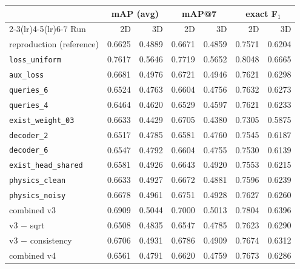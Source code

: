 \begin{tabular}{lrrrrrr}
\toprule
 & \multicolumn{2}{c}{mAP (avg)} & \multicolumn{2}{c}{mAP@7} & \multicolumn{2}{c}{exact F$_1$} \\
\cmidrule(lr){2-3}\cmidrule(lr){4-5}\cmidrule(lr){6-7}
Run & 2D & 3D & 2D & 3D & 2D & 3D \\
\midrule
reproduction (reference) & 0.6625 & 0.4889 & 0.6671 & 0.4859 & 0.7571 & 0.6204 \\
\texttt{loss\_uniform} & 0.7617 & 0.5646 & 0.7719 & 0.5652 & 0.8048 & 0.6665 \\
\texttt{aux\_loss} & 0.6681 & 0.4976 & 0.6721 & 0.4946 & 0.7621 & 0.6298 \\
\texttt{queries\_6} & 0.6524 & 0.4763 & 0.6604 & 0.4756 & 0.7632 & 0.6273 \\
\texttt{queries\_4} & 0.6464 & 0.4620 & 0.6529 & 0.4597 & 0.7621 & 0.6233 \\
\texttt{exist\_weight\_03} & 0.6633 & 0.4429 & 0.6705 & 0.4380 & 0.7305 & 0.5875 \\
\texttt{decoder\_2} & 0.6517 & 0.4785 & 0.6581 & 0.4760 & 0.7545 & 0.6187 \\
\texttt{decoder\_6} & 0.6547 & 0.4792 & 0.6604 & 0.4755 & 0.7530 & 0.6139 \\
\texttt{exist\_head\_shared} & 0.6581 & 0.4926 & 0.6643 & 0.4920 & 0.7553 & 0.6215 \\
\texttt{physics\_clean} & 0.6633 & 0.4927 & 0.6672 & 0.4881 & 0.7596 & 0.6239 \\
\texttt{physics\_noisy} & 0.6678 & 0.4961 & 0.6751 & 0.4928 & 0.7627 & 0.6260 \\
combined v3 & 0.6909 & 0.5044 & 0.7000 & 0.5013 & 0.7804 & 0.6396 \\
v3 $-$ sqrt & 0.6508 & 0.4835 & 0.6547 & 0.4785 & 0.7623 & 0.6290 \\
v3 $-$ consistency & 0.6706 & 0.4931 & 0.6786 & 0.4909 & 0.7674 & 0.6312 \\
combined v4 & 0.6561 & 0.4791 & 0.6620 & 0.4759 & 0.7673 & 0.6286 \\
\bottomrule
\end{tabular}
